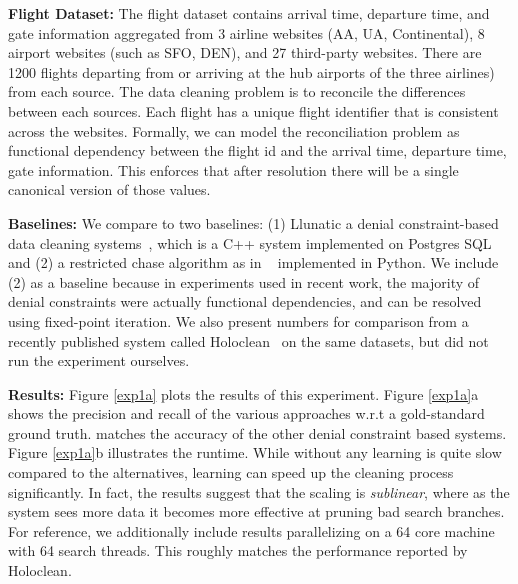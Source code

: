 \vspace{0.5em}\noindent\textbf{Flight Dataset: } The flight dataset contains arrival time, departure time, and gate information aggregated from 3 airline websites (AA, UA, Continental),
8 airport websites (such as SFO, DEN), and 27 third-party
websites.
There are 1200 flights departing from or arriving at the hub airports of the three airlines) from each source.
The data cleaning problem is to reconcile the differences between each sources.
Each flight has a unique flight identifier that is consistent across the websites.
Formally, we can model the reconciliation problem as functional dependency between the flight id and the arrival time, departure time, gate information.
This enforces that after resolution there will be a single canonical version of those values.

\vspace{0.5em}\noindent\textbf{Baselines: } We compare to two baselines: (1) Llunatic a denial constraint-based data cleaning systems~\cite{DBLP:conf/sigmod/DallachiesaEEEIOT13}, which is a C++ system implemented on Postgres SQL and (2) a restricted chase algorithm as in ~\cite{benedikt2017benchmarking} implemented in Python. 
We include (2) as a baseline because in experiments used in recent work, the majority of denial constraints were actually functional dependencies, and can be resolved using fixed-point iteration.
We also present numbers for comparison from a recently published system called Holoclean~\cite{rekatsinas2017holoclean} on the same datasets, but did not run the experiment ourselves.

\vspace{0.5em}\noindent\textbf{Results: } Figure \ref{exp1a} plots the results of this experiment. Figure \ref{exp1a}a shows the precision and recall of the various approaches w.r.t a gold-standard ground truth. \sys matches the accuracy of the other denial constraint based systems. Figure \ref{exp1a}b illustrates the runtime. While \sys without any learning is quite slow compared to the alternatives, learning can speed up the cleaning process significantly.
In fact, the results suggest that the scaling is \emph{sublinear}, where as the system sees more data it becomes more effective at pruning bad search branches.
For reference, we additionally include results parallelizing \sys on a 64 core machine with 64 search threads. This roughly matches the performance reported by Holoclean. 


